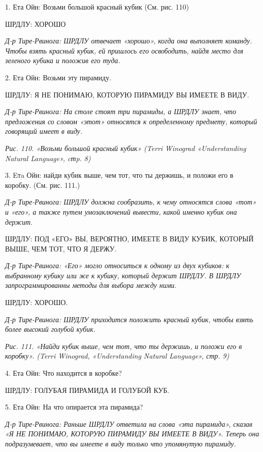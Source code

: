 \documentclass[../main.tex]{subfiles}
\begin{document}
\begin{dialogue}

\EmptyItem

1. Ета Ойн: Возьми большой красный кубик (См. рис. 110)

ШРДЛУ: ХОРОШО

\emph{Д-р Тире-Рвинога: ШРДЛУ отвечает «хорошо», когда она выполняет команду. Чтобы взять красный кубик, ей пришлось его освободить, найдя место для зеленого кубика и положив его туда.}

2. Ета Ойн: Возьми эту пирамиду.

ШРДЛУ: Я НЕ ПОНИМАЮ, КОТОРУЮ ПИРАМИДУ ВЫ ИМЕЕТЕ В ВИДУ.

\emph{Д-р Тире-Рвинога: На столе стоят три пирамиды, а ШРДЛУ знает, что предложения со словом «этот» относятся к определенному предмету, который говорящий имеет в виду.}

\emph{Рис. 110. «Возьми большой красный кубик» (Terri Winograd «Understanding Natural Language», cтp. 8)}

3. Eтa Ойн: найди кубик выше, чем тот, что ты держишь, и положи его в коробку. (См. рис. 111.)

\emph{Д-р Тире-Рвинога: ШРДЛУ должна сообразить, к чему относятся слова «тот» и «его», а также путем умозаключений вывести, какой именно кубик она держит.}

ШРДЛУ: ПОД «ЕГО» ВЫ, ВЕРОЯТНО, ИМЕЕТЕ В ВИДУ КУБИК, КОТОРЫЙ ВЫШЕ, ЧЕМ ТОТ, ЧТО Я ДЕРЖУ.

\emph{Д-р Тире-Рвинога: «Его» могло относиться к одному из двух кубиков: к выбранному кубику или же к кубику, который держит ШРДЛУ. В ШРДЛУ запрограммированны методы для выбора между ними.}

ШРДЛУ: ХОРОШО.

\emph{Д-р Тире-Рвинога: ШРДЛУ приходится положить красный кубик, чтобы взять более высокий голубой кубик.}

\emph{Рис. 111. «Найди кубик выше, чем тот, что ты держишь, и положи его в коробку». (Terri Winograd, «Understanding Natural Language», стр. 9)}

4. Ета Ойн: Что находится в коробке?

ШРДЛУ: ГОЛУБАЯ ПИРАМИДА И ГОЛУБОЙ КУБ.

5. Ета Ойн: На что опирается эта пирамида?

\emph{Д-р Тире-Рвинога: Раньше ШРДЛУ ответила на слова «эта пирамида», сказав «Я НЕ ПОНИМАЮ, КОТОРУЮ ПИРАМИДУ ВЫ ИМЕЕТЕ В ВИДУ». Теперь она подразумевает, что вы имеете в виду только что упомянутую пирамиду.}


\end{dialogue}
\end{document}
